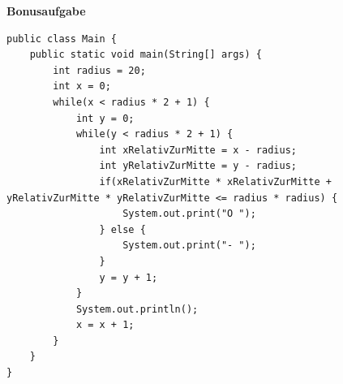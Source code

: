 \documentclass[ngerman,11pt]{article}
\begin{document}
    \textbf{Bonusaufgabe}

    \begin{lstlisting}
public class Main {
    public static void main(String[] args) {
        int radius = 20;
        int x = 0;
        while(x < radius * 2 + 1) {
            int y = 0;
            while(y < radius * 2 + 1) {
                int xRelativZurMitte = x - radius;
                int yRelativZurMitte = y - radius;
                if(xRelativZurMitte * xRelativZurMitte + yRelativZurMitte * yRelativZurMitte <= radius * radius) {
                    System.out.print("O ");
                } else {
                    System.out.print("- ");
                }
                y = y + 1;
            }
            System.out.println();
            x = x + 1;
        }
    }
}
        \end{lstlisting}

    
\end{document}
